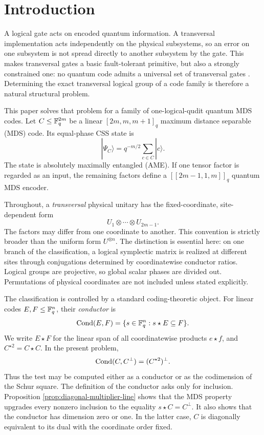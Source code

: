 \section{Introduction}

A logical gate acts on encoded quantum information.  A transversal
implementation acts independently on the physical subsystems, so an error on
one subsystem is not spread directly to another subsystem by the gate.  This
makes transversal gates a basic fault-tolerant primitive, but also a strongly
constrained one: no quantum code admits a universal set of transversal gates
\cite{EastinKnill2009}.  Determining the exact transversal logical group of a
code family is therefore a natural structural problem.

This paper solves that problem for a family of one-logical-qudit quantum MDS
codes.  Let \(C\leq\mathbb F_q^{2m}\) be a linear
\([2m,m,m+1]_q\) maximum distance separable (MDS) code.  Its equal-phase CSS
state is
\begin{equation}\label{eq:equal-phase-css-state}
 |\Psi_C\rangle=q^{-m/2}\sum_{c\in C}|c\rangle.
\end{equation}
The state is absolutely maximally entangled (AME).  If one tensor factor is
regarded as an input, the remaining factors define a
\([[2m-1,1,m]]_q\) quantum MDS encoder.

Throughout, a \emph{transversal} physical unitary has the fixed-coordinate,
site-dependent form
\[
 U_1\otimes\cdots\otimes U_{2m-1}.
\]
The factors may differ from one coordinate to another.  This convention is
strictly broader than the uniform form \(U^{\otimes n}\).  The distinction is
essential here: on one branch of the classification, a logical symplectic
matrix is realized at different sites through conjugations determined by
coordinatewise conductor ratios.  Logical groups are projective, so global
scalar phases are divided out.  Permutations of physical coordinates are not
included unless stated explicitly.

The classification is controlled by a standard coding-theoretic object.  For
linear codes \(E,F\leq\mathbb F_q^n\), their \emph{conductor} is
\[
 \operatorname{Cond}(E,F)=\{s\in\mathbb F_q^n:s\star E\subseteq F\}.
\]
We write \(E\star F\) for the linear span of all coordinatewise products
\(e\star f\), and \(C^{\star2}=C\star C\).  In the present problem,
\[
 \operatorname{Cond}(C,C^\perp)=(C^{\star2})^\perp.
\]
Thus the test may be computed either as a conductor or as the codimension of
the Schur square.  The definition of the conductor asks only for inclusion.  Proposition
\ref{prop:diagonal-multiplier-line} shows that the MDS property upgrades every
nonzero inclusion to the equality \(s\star C=C^\perp\).  It also shows that
the conductor has dimension zero or one.  In the latter case, \(C\) is
diagonally equivalent to its dual with the coordinate order fixed.

